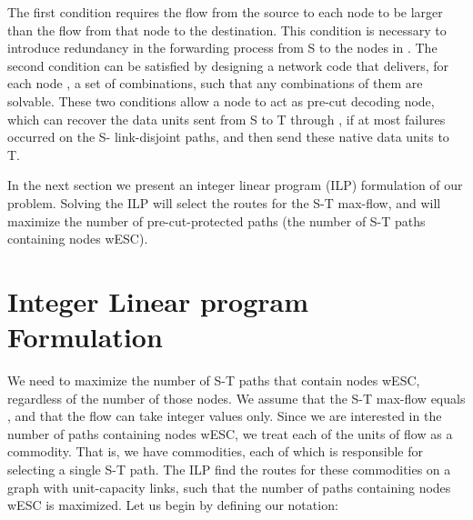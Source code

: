 \documentclass[conference]{IEEEtran}
\begin{document}
The first condition requires the flow from the source to each node  to be larger than the flow from that node to the destination. This condition is necessary to introduce redundancy in the forwarding process from S to the nodes in . The second condition can be satisfied by designing a network code that delivers, for each node , a set of  combinations, such that any  combinations of them are solvable. These two conditions allow a node  to act as pre-cut decoding node, which can recover the data units sent from S to T through , if at most  failures occurred on the S- link-disjoint paths, and then send these native data units to T. 

In the next section we present an integer linear program (ILP) formulation of our problem. Solving the ILP will select the routes for the S-T max-flow, and will maximize the number of pre-cut-protected paths (the number of S-T paths containing nodes wESC). 

\section{Integer Linear program Formulation}
\label{Sec:ILP}

We need to maximize the number of S-T paths that contain nodes wESC, regardless of the number of those nodes. We assume that the S-T max-flow equals , and that the flow can take integer values only. Since we are interested in the number of paths containing nodes wESC, we treat each of the  units of flow as a commodity. That is, we have  commodities, each of which is responsible for selecting a single S-T path. The ILP find the routes for these  commodities on a graph with unit-capacity links, such that the number of paths containing nodes wESC is maximized. Let us begin by defining our notation:
\end{document}
